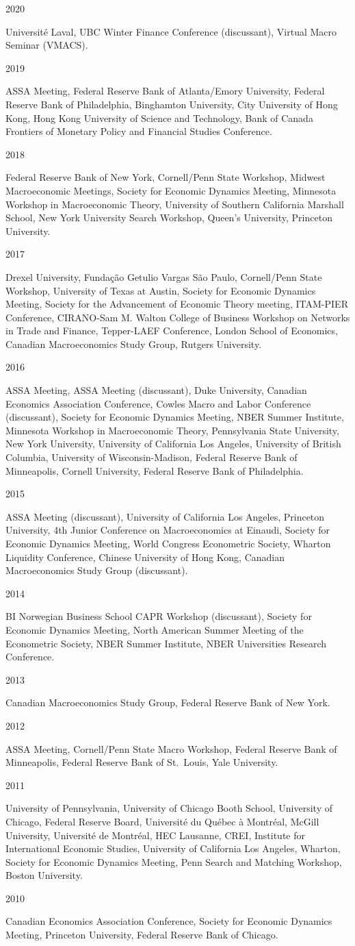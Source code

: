 \documentclass[letterpaper,11pt]{article}
\newcommand{\entry}[2]{\noindent\parbox[t]{0.12\textwidth}{\small #1}\begin{minipage}[t]{0.88\textwidth}#2\end{minipage}\par\vspace{0.7em}}
\begin{document}
\entry{2020}{Université Laval, UBC Winter Finance Conference (discussant), Virtual Macro Seminar (VMACS).}
\entry{2019}{ASSA Meeting, Federal Reserve Bank of Atlanta/Emory University, Federal Reserve Bank of Philadelphia, Binghamton University, City University of Hong Kong, Hong Kong University of Science and Technology, Bank of Canada Frontiers of Monetary Policy and Financial Studies Conference.}
\entry{2018}{Federal Reserve Bank of New York, Cornell/Penn State Workshop, Midwest Macroeconomic Meetings, Society for Economic Dynamics Meeting, Minnesota Workshop in Macroeconomic Theory, University of Southern California Marshall School, New York University Search Workshop, Queen's University, Princeton University.}
\entry{2017}{Drexel University, Fundação Getulio Vargas São Paulo, Cornell/Penn State Workshop, University of Texas at Austin, Society for Economic Dynamics Meeting, Society for the Advancement of Economic Theory meeting, ITAM-PIER Conference, CIRANO-Sam M. Walton College of Business Workshop on Networks in Trade and Finance, Tepper-LAEF Conference, London School of Economics, Canadian Macroeconomics Study Group, Rutgers University.}
\entry{2016}{ASSA Meeting, ASSA Meeting (discussant), Duke University, Canadian Economics Association Conference, Cowles Macro and Labor Conference (discussant), Society for Economic Dynamics Meeting, NBER Summer Institute, Minnesota Workshop in Macroeconomic Theory, Pennsylvania State University, New York University, University of California Los Angeles, University of British Columbia, University of Wisconsin-Madison, Federal Reserve Bank of Minneapolis, Cornell University, Federal Reserve Bank of Philadelphia.}
\entry{2015}{ASSA Meeting (discussant), University of California Los Angeles, Princeton University, 4th Junior Conference on Macroeconomics at Einaudi, Society for Economic Dynamics Meeting, World Congress Econometric Society, Wharton Liquidity Conference, Chinese University of Hong Kong, Canadian Macroeconomics Study Group (discussant).}
\entry{2014}{BI Norwegian Business School CAPR Workshop (discussant), Society for Economic Dynamics Meeting, North American Summer Meeting of the Econometric Society, NBER Summer Institute, NBER Universities Research Conference.}
\entry{2013}{Canadian Macroeconomics Study Group, Federal Reserve Bank of New York.}
\entry{2012}{ASSA Meeting, Cornell/Penn State Macro Workshop, Federal Reserve Bank of Minneapolis, Federal Reserve Bank of St.\ Louis, Yale University.}
\entry{2011}{University of Pennsylvania, University of Chicago Booth School, University of Chicago, Federal Reserve Board, Université du Québec à Montréal, McGill University, Université de Montréal, HEC Lausanne, CREI, Institute for International Economic Studies, University of California Los Angeles, Wharton, Society for Economic Dynamics Meeting, Penn Search and Matching Workshop, Boston University.}
\entry{2010}{Canadian Economics Association Conference, Society for Economic Dynamics Meeting, Princeton University, Federal Reserve Bank of Chicago.}
\end{document}
